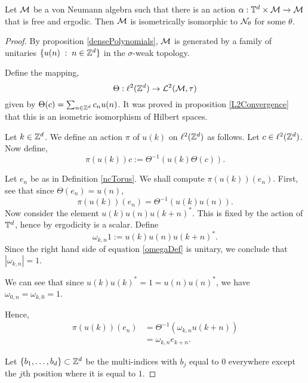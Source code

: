 \begin{proposition}
    Let $\mathcal{M}$ be a von Neumann algebra such that there is an action
    $\alpha:\mathbb{T}^d\times \mathcal{M}\to\mathcal{M}$ that is free and ergodic. Then $\mathcal{M}$
    is isometrically isomorphic to $\mathcal{N}_\theta$ for some $\theta$.
\end{proposition}
\begin{proof}
    By proposition \ref{densePolynomials}, $\mathcal{M}$ is generated
    by a family of unitaries $\{u(n)\;:\;n \in \mathbb{Z}^d\}$
    in the $\sigma$-weak topology.
    
    Define the mapping,
    \begin{equation}
        \Theta:\ell^2(\mathbb{Z}^d) \to \mathcal{L}^2(\mathcal{M},\tau)
    \end{equation}
    given by $\Theta(c) = \sum_{n \in \mathbb{Z}^d} c_nu(n)$. It
    was proved in proposition \ref{L2Convergence} that this
    is an isometric isomorphism of Hilbert spaces. 
    
    Let $k \in \mathbb{Z}^d$. We define
    an action $\pi$ of $u(k)$ on $\ell^2(\mathbb{Z}^d)$ as follows.
    Let $c \in \ell^2(\mathbb{Z}^d)$. Now define,
    \begin{equation}
        \pi(u(k))c := \Theta^{-1}(u(k)\Theta(c)).
    \end{equation}   
    
    Let $e_n$ be as in Definition \ref{ncTorus}. We shall compute $\pi(u(k))(e_n)$.
    First, see that since $\Theta(e_n) = u(n)$,
    \begin{equation}
        \pi(u(k))(e_n) = \Theta^{-1}(u(k)u(n)).
    \end{equation}
    Now consider the element $u(k)u(n)u(k+n)^*$. This is
    fixed by the action of $\mathbb{T}^d$, hence by ergodicity
    is a scalar. Define
    \begin{equation}
    \label{omegaDef}
        \omega_{k,n}1 := u(k)u(n)u(k+n)^*.
    \end{equation}
    Since the right hand side of equation \ref{omegaDef} is unitary,
    we conclude that $|\omega_{k,n}| = 1$. 
    
    We can see that since $u(k)u(k)^* = 1 = u(n)u(n)^*$,
    we have $\omega_{0,n} = \omega_{k,0} = 1$.

    Hence,
    \begin{align}
        \pi(u(k))(e_n) &= \Theta^{-1}(\omega_{k,n}u(k+n))\\
                       &= \omega_{k,n}e_{k+n}.
    \end{align}
    
    Let $\{b_1,\ldots,b_d\} \subset \mathbb{Z}^d$ be the multi-indices
    with $b_j$ equal to $0$ everywhere except the $j$th position where
    it is equal to $1$. 
    

\end{proof}
